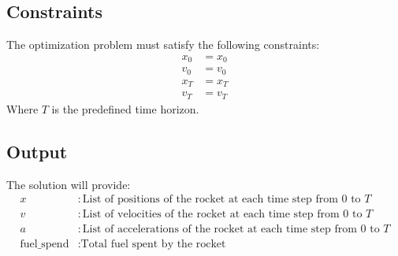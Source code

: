 \documentclass{article}
\begin{document}
\subsection*{Constraints}
The optimization problem must satisfy the following constraints:
\begin{align}
    x_0 & = x_0 \\
    v_0 & = v_0 \\
    x_T & = x_T \\
    v_T & = v_T
\end{align}
Where \(T\) is the predefined time horizon.

\subsection*{Output}
The solution will provide:
\begin{align*}
    x & : \text{List of positions of the rocket at each time step from } 0 \text{ to } T \\
    v & : \text{List of velocities of the rocket at each time step from } 0 \text{ to } T \\
    a & : \text{List of accelerations of the rocket at each time step from } 0 \text{ to } T \\
    \text{fuel\_spend} & : \text{Total fuel spent by the rocket}
\end{align*}
\end{document}
